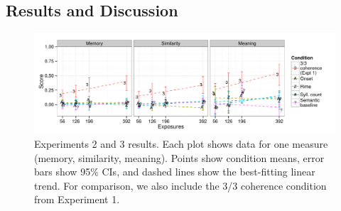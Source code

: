 \documentclass[man,floatsintext]{apa6}
\begin{document}
\subsection{Results and Discussion}

\begin{figure}[t]
  \begin{center}
    \includegraphics[width=1.0\linewidth]{x23}
    \caption{Experiments 2 and 3 results. Each plot shows data for one
      measure (memory, similarity, meaning). Points show condition means,
      error bars show 95\% CIs, and dashed lines show the best-fitting
      linear trend. For comparison, we also include the 3/3 coherence
      condition from Experiment 1.}
    \label{expt23-results}
  \end{center}
\end{figure}
\end{document}
